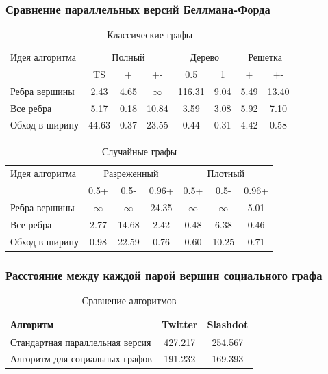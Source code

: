 \documentclass[10pt, compress]{beamer}
\begin{document}
\begin{frame}[fragile]
  \frametitle{Сравнение параллельных версий Беллмана-Форда}
\begin{table}
\centering
\begin{tabular}{l|ccc|cc|cc}  
Идея алгоритма& \multicolumn{3}{c}{Полный} & \multicolumn{2}{c}{Дерево} & \multicolumn{2}{c}{Решетка} \\
& TS & + & +- & 0.5 & 1 & + & +- \\
\hline\hline
Ребра вершины & \textcolor{cssgreen}{2.43} & 4.65 & $\infty$ & 116.31 & 9.04 & 5.49 & 13.40\\  
Все ребра & 5.17 & \textcolor{cssgreen}{0.18} & \textcolor{cssgreen}{10.84} & 3.59 & 3.08 & 5.92 & 7.10  \\
Обход в ширину & 44.63 & 0.37 & 23.55 & \textcolor{cssgreen}{0.44} & \textcolor{cssgreen}{0.31} & \textcolor{cssgreen}{4.42} & \textcolor{cssgreen}{0.58} \\
\end{tabular}
\caption{Классические графы}
\label{graph_description}
\end{table}


\begin{table}
\centering
\begin{tabular}{l|ccc|ccc}  
Идея алгоритма& \multicolumn{3}{c}{Разреженный} & \multicolumn{3}{c}{Плотный}\\
& 0.5+  & 0.5- & 0.96+ & 0.5+ & 0.5- & 0.96+\\
\hline\hline
Ребра вершины & $\infty$ & $\infty$ & 24.35 & $\infty$ & $\infty$ & 5.01 \\  
Все ребра & 2.77 & \textcolor{cssgreen}{14.68} & 2.42 & \textcolor{cssgreen}{0.48}  & \textcolor{cssgreen}{6.38}  & \textcolor{cssgreen}{0.46} \\
Обход в ширину & \textcolor{cssgreen}{0.98} & 22.59 & \textcolor{cssgreen}{0.76}  & 0.60  & 10.25 & 0.71 \\
\end{tabular}
\caption{Случайные графы}
\label{graph_description}
\end{table}

\end{frame}


\begin{frame}[fragile]
  \frametitle{Расстояние между каждой парой вершин социального графа}

\begin{table}
\centering

\begin{tabular}{l|c|c}  
Алгоритм & Twitter & Slashdot\\
\hline\hline
Стандартная параллельная версия & 427.217 & 254.567 \\  
Алгоритм для социальных графов & \textcolor{cssgreen}{191.232} & \textcolor{cssgreen}{169.393}  \\
\hline
\end{tabular}

\caption{Сравнение алгоритмов}
\label {table:algo_floyd_comparison}
\end{table}
  
\end{frame}
\end{document}
